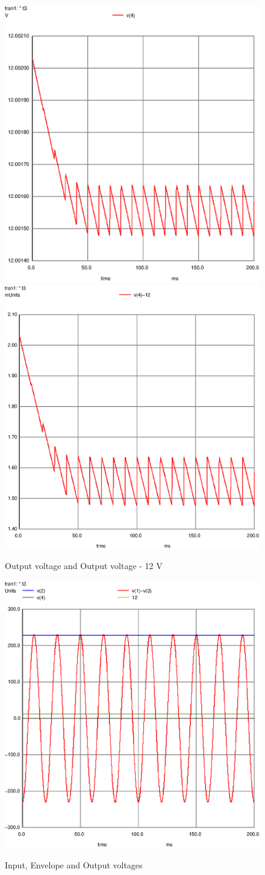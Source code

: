 \begin{figure}[!ht] \centering
\caption{Output voltage and Output voltage - 12 V}
\includegraphics[width=0.45\linewidth]{vout.eps}
\includegraphics[width=0.45\linewidth]{vout(ac+dc).eps}
\label{fig:gteo2}
\end{figure}


\begin{figure}[!ht] \centering
\caption{Input, Envelope and Output voltages}
\includegraphics[width=0.6\linewidth]{vs_vout.eps}
\label{fig:gteo4}
\end{figure}


